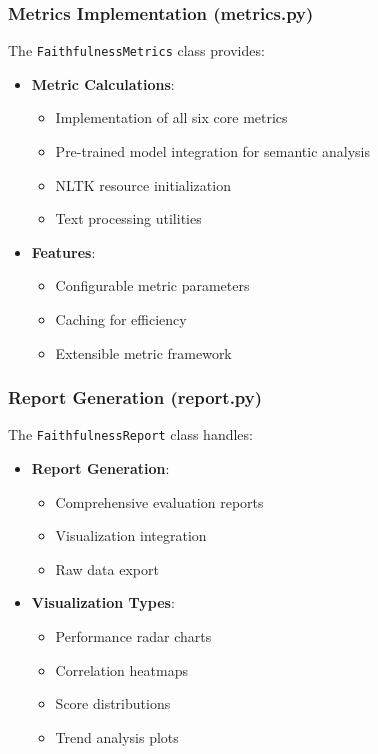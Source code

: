 \subsubsection{Metrics Implementation (metrics.py)}
The \texttt{FaithfulnessMetrics} class provides:
\begin{itemize}
    \item \textbf{Metric Calculations}:
    \begin{itemize}
        \item Implementation of all six core metrics
        \item Pre-trained model integration for semantic analysis
        \item NLTK resource initialization
        \item Text processing utilities
    \end{itemize}
    \item \textbf{Features}:
    \begin{itemize}
        \item Configurable metric parameters
        \item Caching for efficiency
        \item Extensible metric framework
    \end{itemize}
\end{itemize}

\subsubsection{Report Generation (report.py)}
The \texttt{FaithfulnessReport} class handles:
\begin{itemize}
    \item \textbf{Report Generation}:
    \begin{itemize}
        \item Comprehensive evaluation reports
        \item Visualization integration
        \item Raw data export
    \end{itemize}
    \item \textbf{Visualization Types}:
    \begin{itemize}
        \item Performance radar charts
        \item Correlation heatmaps
        \item Score distributions
        \item Trend analysis plots
    \end{itemize}
\end{itemize}


